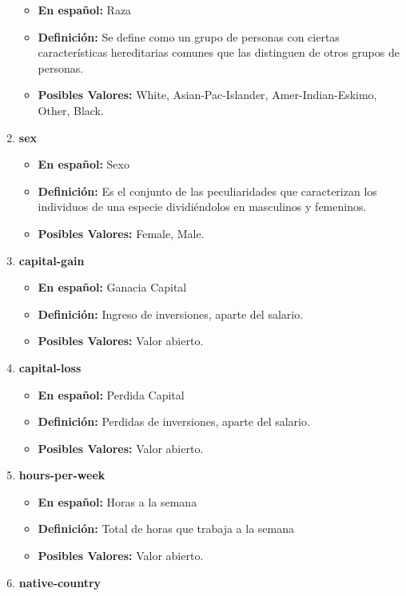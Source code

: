 \documentclass{article}
\begin{document}
\begin{enumerate}
\begin{itemize}
       \item \textbf{En español:} Raza
       \item \textbf{Definición:} Se define como un grupo de personas con ciertas características hereditarias comunes que las distinguen de otros grupos de personas.
       \item \textbf{Posibles Valores:} White, Asian-Pac-Islander, Amer-Indian-Eskimo, Other, Black.
     \end{itemize}
     \item \textbf{sex}
     \begin{itemize}
       \item \textbf{En español:} Sexo
       \item \textbf{Definición:} Es el conjunto de las peculiaridades que caracterizan los individuos de una especie dividiéndolos en masculinos y femeninos.
       \item \textbf{Posibles Valores:} Female, Male.
     \end{itemize}
     \item \textbf{capital-gain}
     \begin{itemize}
       \item \textbf{En español:} Ganacia Capital
       \item \textbf{Definición:} Ingreso de inversiones, aparte del salario.
       \item \textbf{Posibles Valores:} Valor abierto.
     \end{itemize}
     \item \textbf{capital-loss}
     \begin{itemize}
       \item \textbf{En español:} Perdida Capital
       \item \textbf{Definición:} Perdidas de inversiones, aparte del salario.
       \item \textbf{Posibles Valores:} Valor abierto.
     \end{itemize}
     \item \textbf{hours-per-week}
     \begin{itemize}
       \item \textbf{En español:} Horas a la semana
       \item \textbf{Definición:} Total de horas que trabaja a la semana
       \item \textbf{Posibles Valores:} Valor abierto.
     \end{itemize}
     \item \textbf{native-country}

\end{enumerate}
\end{document}
